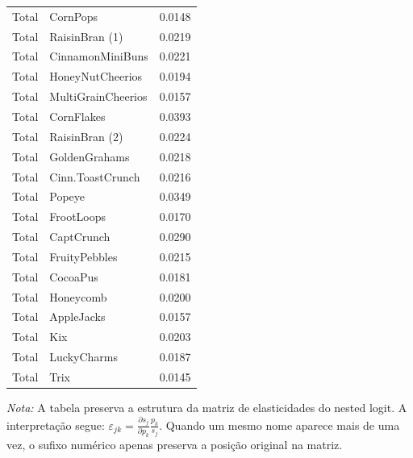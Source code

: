\begin{table}[H]
\begin{tabular}{llr}
Total & CornPops & 0.0148 \\
Total & RaisinBran (1) & 0.0219 \\
Total & CinnamonMiniBuns & 0.0221 \\
Total & HoneyNutCheerios & 0.0194 \\
Total & MultiGrainCheerios & 0.0157 \\
Total & CornFlakes & 0.0393 \\
Total & RaisinBran (2) & 0.0224 \\
Total & GoldenGrahams & 0.0218 \\
Total & Cinn.ToastCrunch & 0.0216 \\
Total & Popeye & 0.0349 \\
Total & FrootLoops & 0.0170 \\
Total & CaptCrunch & 0.0290 \\
Total & FruityPebbles & 0.0215 \\
Total & CocoaPus & 0.0181 \\
Total & Honeycomb & 0.0200 \\
Total & AppleJacks & 0.0157 \\
Total & Kix & 0.0203 \\
Total & LuckyCharms & 0.0187 \\
Total & Trix & 0.0145 \\
\bottomrule
\end{tabular}

\vspace{0.3em}
\footnotesize
\textit{Nota:} A tabela preserva a estrutura da matriz de elasticidades do nested logit. A interpretação segue: $\varepsilon_{jk}=\frac{\partial s_j}{\partial p_k}\frac{p_k}{s_j}$. Quando um mesmo nome aparece mais de uma vez, o sufixo numérico apenas preserva a posição original na matriz.
\end{table}
\endgroup


